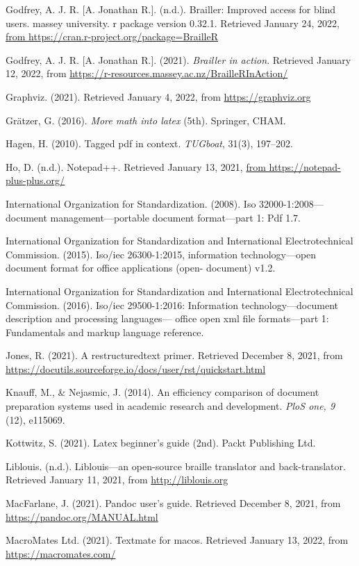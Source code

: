 \documentclass[11pt]{sig-alternate}
\begin{document}
\begin{large}
Godfrey, A. J. R. [A. Jonathan R.]. (n.d.). Brailler: Improved access for blind users. massey university. r package version 0.32.1. Retrieved January 24, 2022, \url{from https://cran.r-project.org/package=BrailleR}

Godfrey, A. J. R. [A. Jonathan R.]. (2021). \textit{Brailler in action}. Retrieved January 12, 2022, from \url{https://r-resources.massey.ac.nz/BrailleRInAction/}

Graphviz. (2021). Retrieved January 4, 2022, from \url{https://graphviz.org}

Grätzer, G. (2016).\textit{ More math into latex} (5th). Springer, CHAM.

Hagen, H. (2010). Tagged pdf in context.\textit{ TUGboat}, 31(3), 197–202.

Ho, D. (n.d.). Notepad++. Retrieved January 13, 2021, \url{from https://notepad-plus-plus.org/}

International Organization for Standardization. (2008). Iso 32000-1:2008—document management—portable document format—part 1: Pdf 1.7.

International Organization for Standardization and International Electrotechnical Commission. (2015). Iso/iec 26300-1:2015, information technology—open document format for office applications (open- document) v1.2.

International Organization for Standardization and International Electrotechnical Commission. (2016). Iso/iec 29500-1:2016: Information technology—document description and processing languages— office open xml file formats—part 1: Fundamentals and markup language reference.

Jones, R. (2021). A restructuredtext primer. Retrieved December 8, 2021, from \url{https://docutils.sourceforge.io/docs/user/rst/quickstart.html}

Knauff, M., \& Nejasmic, J. (2014). An efficiency comparison of document preparation systems used in academic research and development. \textit{PloS one, 9} (12), e115069.

Kottwitz, S. (2021). Latex beginner’s guide (2nd). Packt Publishing Ltd.

Liblouis. (n.d.). Liblouis—an open-source braille translator and back-translator. Retrieved January 11, 2021, from \url{http://liblouis.org}

MacFarlane, J. (2021). Pandoc user’s guide. Retrieved December 8, 2021, from \url{https://pandoc.org/MANUAL.html}

MacroMates Ltd. (2021). Textmate for macos. Retrieved January 13, 2022, from \url{https://macromates.com/}


\end{large}
\end{document}
